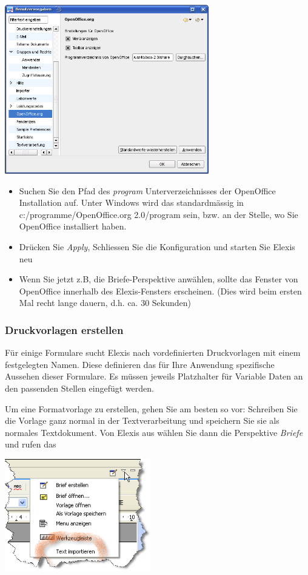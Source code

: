 \includegraphics[width=3.5in]{images/grundkonfmand2.png}

\begin{itemize}
 \item Suchen Sie den Pfad des \textit{program} Unterverzeichnisses der OpenOffice Installation auf. Unter Windows wird das standardmässig in c:/programme/OpenOffice.org 2.0/program sein, bzw. an der Stelle, wo Sie OpenOffice installiert haben.
 \item Drücken Sie \textit{Apply}, Schliessen Sie die Konfiguration und starten Sie Elexis neu
 \item Wenn Sie jetzt z.B, die Briefe-Perspektive anwählen, sollte das Fenster von OpenOffice innerhalb des Elexis-Fensters erscheinen. (Dies wird beim ersten Mal recht lange dauern, d.h. ca. 30 Sekunden)
\end{itemize}

\subsubsection{Druckvorlagen erstellen}
Für einige Formulare sucht Elexis nach vordefinierten Druckvorlagen mit einem festgelegten Namen. Diese definieren das für Ihre Anwendung spezifische Aussehen dieser Formulare. Es müssen jeweils Platzhalter für Variable Daten an den passenden Stellen eingefügt werden.

Um eine Formatvorlage zu erstellen, gehen Sie am besten so vor: Schreiben Sie die Vorlage ganz normal in der Textverarbeitung und speichern Sie sie als normales Textdokument. Von Elexis aus wählen Sie dann die Perspektive \textit{Briefe} und rufen das

\includegraphics[width=2.5in]{images/import.png}

